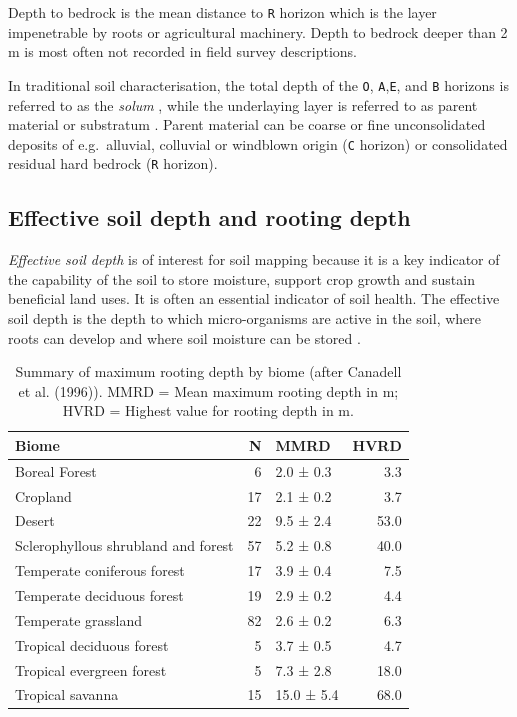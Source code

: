 \documentclass[graybox,natbib,nospthms,UStrade]{svmono}
\let\BeginKnitrBlock\begin \let\EndKnitrBlock\end
\let\BeginKnitrBlock\begin \let\EndKnitrBlock\end
\begin{document}
\BeginKnitrBlock{rmdnote}
Depth to bedrock is the mean distance to \texttt{R} horizon which is the layer
impenetrable by roots or agricultural machinery. Depth to bedrock deeper
than 2 m is most often not recorded in field survey descriptions.
\EndKnitrBlock{rmdnote}

In traditional soil characterisation, the total depth of the \texttt{O},
\texttt{A},\texttt{E}, and \texttt{B} horizons is referred to as the \emph{solum}
\citep{harpstead2001soil}, while the underlaying layer is referred to as
parent material or substratum \citep{SSDS1993}. Parent material can be coarse
or fine unconsolidated deposits of e.g.~alluvial, colluvial or windblown
origin (\texttt{C} horizon) or consolidated residual hard bedrock (\texttt{R}
horizon).

\hypertarget{effective-soil-depth-and-rooting-depth}{%
\subsection{Effective soil depth and rooting depth}\label{effective-soil-depth-and-rooting-depth}}

\emph{Effective soil depth} is of interest for soil mapping because it is a
key indicator of the capability of the soil to store moisture, support
crop growth and sustain beneficial land uses. It is often an essential
indicator of soil health. The effective soil depth is the depth to which
micro-organisms are active in the soil, where roots can develop and
where soil moisture can be stored \citep{FAO2006}.

\begin{table}[t]

\caption{\label{tab:rootingdepths}Summary of maximum rooting depth by biome (after Canadell et al. (1996)). MMRD = Mean maximum rooting depth in m; HVRD = Highest value for rooting depth in m.}
\centering
\begin{tabular}{lrlr}
\toprule
Biome & N & MMRD & HVRD\\
\midrule
Boreal Forest & 6 & 2.0 ± 0.3 & 3.3\\
Cropland & 17 & 2.1 ± 0.2 & 3.7\\
Desert & 22 & 9.5 ± 2.4 & 53.0\\
Sclerophyllous shrubland and forest & 57 & 5.2 ± 0.8 & 40.0\\
Temperate coniferous forest & 17 & 3.9 ± 0.4 & 7.5\\
\addlinespace
Temperate deciduous forest & 19 & 2.9 ± 0.2 & 4.4\\
Temperate grassland & 82 & 2.6 ± 0.2 & 6.3\\
Tropical deciduous forest & 5 & 3.7 ± 0.5 & 4.7\\
Tropical evergreen forest & 5 & 7.3 ± 2.8 & 18.0\\
Tropical savanna & 15 & 15.0 ± 5.4 & 68.0\\
\bottomrule
\end{tabular}
\end{table}
\end{document}
